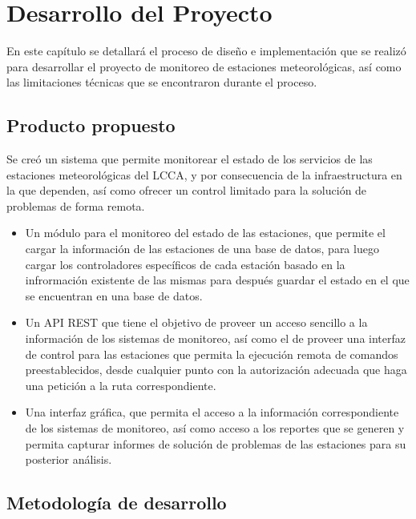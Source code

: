 \chapter{Desarrollo del Proyecto}

En este capítulo se detallará el proceso de diseño e implementación que se realizó para desarrollar el proyecto de monitoreo de estaciones meteorológicas, así como las limitaciones técnicas que se encontraron durante el proceso.

\section{Producto propuesto}

Se creó un sistema que permite monitorear el estado de los servicios de las estaciones meteorológicas del LCCA, y por consecuencia de la infraestructura en la que dependen, así como ofrecer un control limitado para la solución de problemas de forma remota.


\begin{itemize}
   \item Un módulo para el monitoreo del estado de las estaciones, que permite el cargar la información de las estaciones de una base de datos, para luego cargar los controladores específicos de cada estación basado en la infrormación existente de las mismas para después guardar el estado en el que se encuentran en una base de datos.

   \item Un API REST que tiene el objetivo de proveer un acceso sencillo a la información de los sistemas de monitoreo, así como el de proveer una interfaz de control para las estaciones que permita la ejecución remota de comandos preestablecidos, desde cualquier punto con la autorización adecuada que haga una petición a la ruta correspondiente.

   \item Una interfaz gráfica, que permita el acceso a la información correspondiente de los sistemas de monitoreo, así como acceso a los reportes que se generen y permita capturar informes de solución de problemas de las estaciones para su posterior análisis.
\end{itemize}

\section{Metodología de desarrollo}

